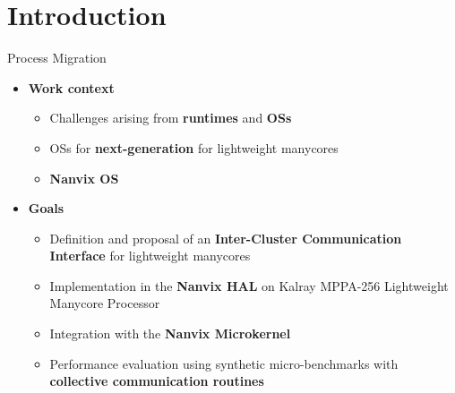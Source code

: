 \section{Introduction}

	\begin{frame}[fragile]{Process Migration}
		\begin{itemize}
			\item \textbf{Work context}
			\begin{itemize}
				\setlength \itemsep{0.3em}

				\item Challenges arising from \textbf{runtimes} and \textbf{OSs}
				\item OSs for \textbf{next-generation} for lightweight manycores
				\item \textbf{Nanvix OS}
			\end{itemize}
		\end{itemize}

		\begin{itemize}
			\item \textbf{Goals}
			\begin{itemize}
				\setlength \itemsep{0.3em}

				\item Definition and proposal of an \textbf{Inter-Cluster Communication Interface} for lightweight manycores
				\item Implementation in the \textbf{Nanvix HAL} on Kalray MPPA-256 Lightweight Manycore Processor
				\item Integration with the \textbf{Nanvix Microkernel}
				\item Performance evaluation using synthetic micro-benchmarks with \textbf{collective communication routines}
			\end{itemize}
		\end{itemize}

	\end{frame}

